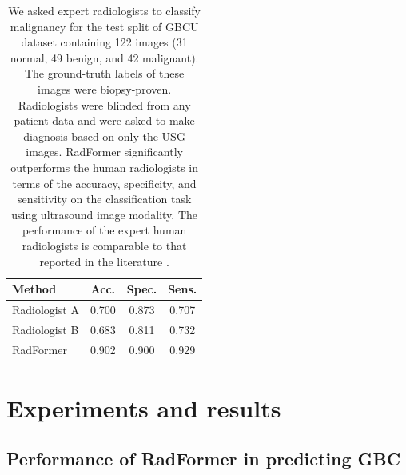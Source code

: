 \documentclass[twocolumn,final]{elsarticle}
\def\myarch{RadFormer\xspace}
\begin{document}
\begin{table}[t]
	\centering
	\begin{tabular}{lccc}
		\toprule
		\textbf{Method}	& \textbf{Acc.} & \textbf{Spec.} & \textbf{Sens.} \\
		\midrule
		Radiologist A & 0.700 & 0.873 & 0.707  \\
		Radiologist B & 0.683 & 0.811 & 0.732  \\
		\midrule%
		\myarch & 0.902 & 0.900 & 0.929 \\
		\bottomrule
	\end{tabular}
	\caption{We asked expert radiologists to classify malignancy for the test split of GBCU dataset \citep{basu2022surpassing} containing 122 images (31 normal, 49 benign, and 42 malignant). The ground-truth labels of these images were biopsy-proven. Radiologists were blinded from any patient data and were asked to make diagnosis based on only the USG images. \myarch significantly outperforms the human radiologists in terms of the accuracy, specificity, and sensitivity on the classification task using ultrasound image modality. The performance of the expert human radiologists is comparable to that reported in the literature \citep{bo2019diagnostic, gupta2020evaluation}.}
	\label{tab:perf_human}
\end{table}


\section{Experiments and results}
%
\subsection{Performance of \myarch in predicting GBC}
\end{document}
